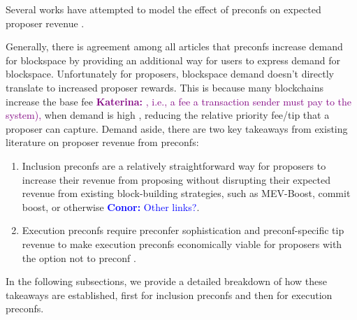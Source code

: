 \documentclass[a4paper]{article}
\theoremstyle{boldstyle}
\newcommand{\cm}[1]{\textcolor{blue}{\textbf{Conor:} #1}}
\newcommand{\ks}[1]{\textcolor{purple}{\textbf{Katerina:} #1}}
\newcommand{\todocm}[1]{\todo[color=blue!40]{\textbf{Conor:} #1}}
\begin{document}
     Several works have attempted to model the effect of preconfs on expected proposer revenue \cite{W:PreconfirmationsundertheNOlens,W:EstimatingtheRevenuefromIndependentSub-SlotAuctionPreconfirmations,W:AnalysingExpectedProposerRevenuefromPreconfirmations,W:APricingModelforInclusionPreconfirmations} \todocm{identify other pricing works}. 
     
     Generally, there is agreement among all articles that preconfs increase demand for blockspace by providing an additional way for users to express demand for blockspace. Unfortunately for proposers, blockspace demand doesn't directly translate to increased proposer rewards. This is because many blockchains increase the base fee \ks{, i.e., a fee a transaction sender must pay to the system),} when demand is high \cite{EIP1559_Economic_Analysis}, reducing the relative priority fee/tip that a proposer can capture. Demand aside, there are two key takeaways from existing literature on proposer revenue from preconfs: 
        
     \begin{enumerate}
         \item Inclusion preconfs are a relatively straightforward way for proposers to increase their revenue from proposing without disrupting their expected revenue from existing block-building strategies, such as MEV-Boost, commit boost, or otherwise \cite{W:APricingModelforInclusionPreconfirmations} \cm{Other links?}.
         \item Execution preconfs require preconfer sophistication and preconf-specific tip revenue to make execution preconfs economically viable for proposers with the option not to preconf \cite{W:PreconfirmationsundertheNOlens,W:EstimatingtheRevenuefromIndependentSub-SlotAuctionPreconfirmations,W:AnalysingExpectedProposerRevenuefromPreconfirmations}. 
     \end{enumerate}

    In the following subsections, we provide a detailed breakdown of how these takeaways are established, first for inclusion preconfs and then for execution preconfs. 
    
\end{document}
